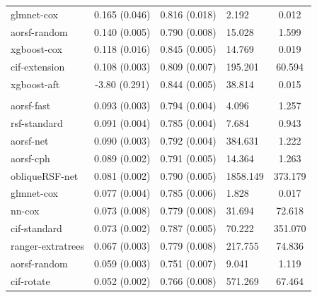 \documentclass[twoside,11pt]{article}\usepackage[]{graphicx}\usepackage[]{xcolor}
\newenvironment{knitrout}{}{} %
\begin{document}
\begin{knitrout}
\begin{longtable}[t]{lcclc}
\hspace{1em}glmnet-cox & 0.165 (0.046) & 0.816 (0.018) & 2.192 & 0.012\\
\hspace{1em}aorsf-random & 0.140 (0.005) & 0.790 (0.008) & 15.028 & 1.599\\
\hspace{1em}xgboost-cox & 0.118 (0.016) & 0.845 (0.005) & 14.769 & 0.019\\
\hspace{1em}cif-extension & 0.108 (0.003) & 0.809 (0.007) & 195.201 & 60.594\\
\hspace{1em}xgboost-aft & -3.80 (0.291) & 0.844 (0.005) & 38.814 & 0.015\\
\addlinespace[0.3em]
\hline
\multicolumn{5}{l}{\textit{\textbf{ARIC; stroke, n = 13623, p = 41}}}\\
\hline
\hspace{1em}aorsf-fast & 0.093 (0.003) & 0.794 (0.004) & 4.096 & 1.257\\
\hspace{1em}rsf-standard & 0.091 (0.004) & 0.785 (0.004) & 7.684 & 0.943\\
\hspace{1em}aorsf-net & 0.090 (0.003) & 0.792 (0.004) & 384.631 & 1.222\\
\hspace{1em}aorsf-cph & 0.089 (0.002) & 0.791 (0.005) & 14.364 & 1.263\\
\hspace{1em}obliqueRSF-net & 0.081 (0.002) & 0.790 (0.005) & 1858.149 & 373.179\\
\hspace{1em}glmnet-cox & 0.077 (0.004) & 0.785 (0.006) & 1.828 & 0.017\\
\hspace{1em}nn-cox & 0.073 (0.008) & 0.779 (0.008) & 31.694 & 72.618\\
\hspace{1em}cif-standard & 0.073 (0.002) & 0.787 (0.005) & 70.222 & 351.070\\
\hspace{1em}ranger-extratrees & 0.067 (0.003) & 0.779 (0.008) & 217.755 & 74.836\\
\hspace{1em}aorsf-random & 0.059 (0.003) & 0.751 (0.007) & 9.041 & 1.119\\
\hspace{1em}cif-rotate & 0.052 (0.002) & 0.766 (0.008) & 571.269 & 67.464\\

\end{longtable}
\end{knitrout}
\end{document}
